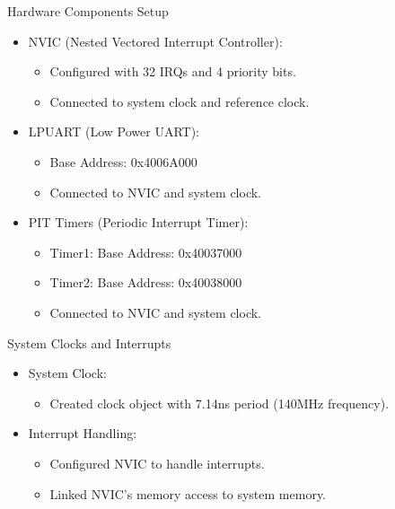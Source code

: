 \begin{frame}{Hardware Components Setup}
    \begin{itemize}
        \item NVIC (Nested Vectored Interrupt Controller):
        \begin{itemize}
            \item Configured with 32 IRQs and 4 priority bits.
            \item Connected to system clock and reference clock.
        \end{itemize}
        \item LPUART (Low Power UART):
        \begin{itemize}
            \item Base Address: 0x4006A000
            \item Connected to NVIC and system clock.
        \end{itemize}
        \item PIT Timers (Periodic Interrupt Timer):
        \begin{itemize}
            \item Timer1: Base Address: 0x40037000
            \item Timer2: Base Address: 0x40038000
            \item Connected to NVIC and system clock.
        \end{itemize}
    \end{itemize}
\end{frame}

\begin{frame}{System Clocks and Interrupts}
    \begin{itemize}
        \item System Clock:
        \begin{itemize}
            \item Created clock object with 7.14ns period (140MHz frequency).
        \end{itemize}
        \item Interrupt Handling:
        \begin{itemize}
            \item Configured NVIC to handle interrupts.
            \item Linked NVIC's memory access to system memory.
        \end{itemize}
    \end{itemize}
\end{frame}

